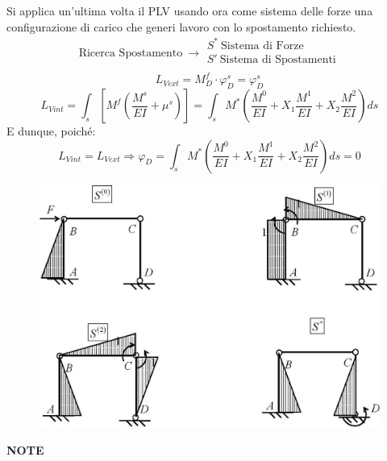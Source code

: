 \documentclass{article}
\begin{document}
\begin{adjustwidth}{2in}{}
		Si applica un'ultima  volta il PLV usando ora come sistema delle forze una configurazione di carico che
		generi lavoro con lo spostamento richiesto.
		\[
		\text{Ricerca Spostamento} ~ \rightarrow \begin{array}{c}
			S^* ~ \text{Sistema di Forze} \\
			S'~ \text{Sistema di Spostamenti} \\			
		\end{array}
		\]
		\[L_{Vext} = M_{D}^f \cdot \varphi_{D}^s = \varphi_D^s \]
		\[ 
		L_{Vint} = \int_{s}\left[ M^f\left( \dfrac{M^s}{EI} +\mu^s \right)\right] = \int_{s} M^*\left( \dfrac{M^0}{EI}  +X_1\dfrac{M^1}{EI}+X_2\dfrac{M^2}{EI} \right) ds 		
		\]	
		E dunque, poiché:
		\[L_{Vint} = L_{Vext} \Rightarrow \varphi_D = \int_{s} M^*\left( \dfrac{M^0}{EI}  +X_1\dfrac{M^1}{EI}+X_2\dfrac{M^2}{EI} \right) ds  = 0\]
		
\begin{figure}[H]
	\centering
	\includegraphics[width=0.7\linewidth]{"immagini/1.PARTE8_Pagina_75"}
\end{figure}

\newpage
{\Large \textbf{NOTE}}
	

















\end{adjustwidth}
\end{document}
